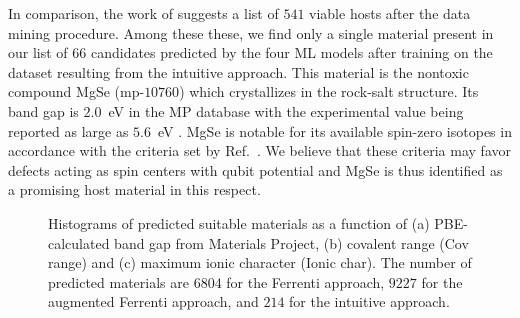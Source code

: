 \documentclass[superscriptaddress,unsortedaddress,
 amsmath,amssymb,
 aps,
]{revtex4-2}
\newcommand{\oliver}[1]{\textcolor{violet}{#1}}
\begin{document}
In comparison, the work of \citeauthor{Ferrenti2020} \cite{Ferrenti2020} suggests a list of $541$ viable hosts after the data mining procedure.  
Among these these, we find only a single material present in our list of $66$ candidates predicted by the four ML models after training on the dataset resulting from the intuitive approach. This material is the nontoxic compound MgSe (mp-$10760$) which crystallizes in the rock-salt structure. Its band gap is $2.0$~eV in the MP database with the experimental value being reported as large as $5.6$~eV  \cite{SaumGeorge1959}.  MgSe is notable for its available spin-zero isotopes in accordance with the criteria set by \citeauthor{Ferrenti2020} Ref.~\cite{Ferrenti2020}. We believe that these criteria may favor defects acting as spin centers with qubit potential and MgSe is thus identified as a promising host material in this respect.   

\begin{figure}%
    \centering
    \begin{subfigure}{1\textwidth}
        \centering
        
        \subcaption[]{}
    \end{subfigure}%

    
    \begin{subfigure}{1\textwidth}
        \centering
        
        \subcaption[]{}
    \end{subfigure}

    \begin{subfigure}{1\textwidth}
        \centering
        
        \subcaption[]{}
    \end{subfigure}
    
    \caption{Histograms of predicted suitable materials as a function of (a) PBE-calculated band gap from Materials Project, (b) covalent range (Cov range) and (c) maximum ionic character (Ionic char). The number of predicted materials are $6804$ for the Ferrenti approach, $9227$ for the augmented Ferrenti approach, and $214$ for the intuitive approach.}
    \label{fig:histogram}
\end{figure}
\end{document}
